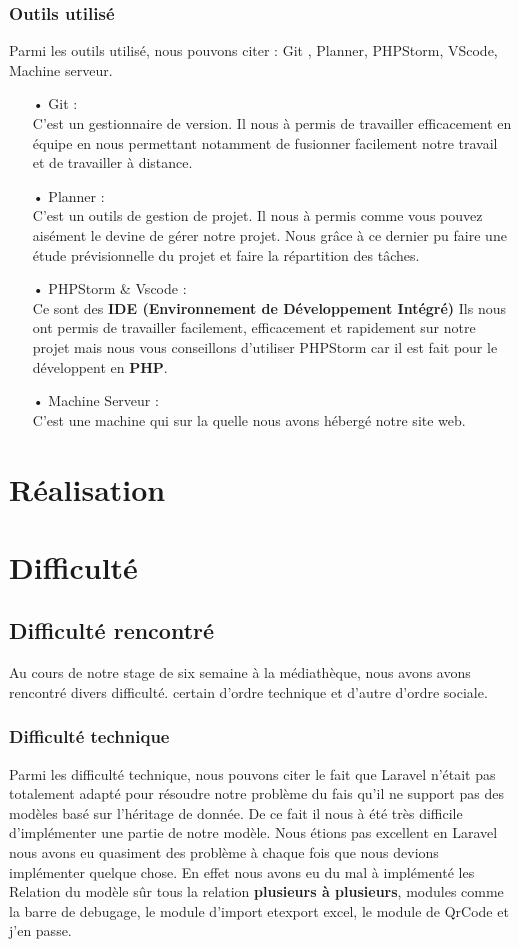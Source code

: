 \documentclass[12pt,a4paper]{article}
\begin{document}
\subsubsection{Outils utilisé}
Parmi les outils utilisé, nous pouvons citer : Git , Planner, PHPStorm, VScode, Machine serveur.
\begin{itemize}
\item[•] Git : \\
C'est un gestionnaire de version. Il nous à permis de travailler efficacement en équipe en nous
permettant notamment de fusionner facilement notre travail et de travailler à distance. 
\item[•] Planner : \\
C'est un outils de gestion de projet. Il nous à permis comme vous pouvez aisément le devine de 
gérer notre projet. Nous grâce à ce dernier pu faire une étude prévisionnelle du projet et faire
la répartition des tâches.
\item[•] PHPStorm \& Vscode : \\
Ce sont des \textbf{IDE (Environnement de Développement Intégré)} Ils nous ont permis de
travailler facilement, efficacement et rapidement sur notre projet mais nous vous conseillons 
d'utiliser PHPStorm car il est fait pour le développent en \textbf{PHP}.
\item[•] Machine Serveur : \\
C'est une machine qui sur la quelle nous avons hébergé notre site web.
\end{itemize}
\section{Réalisation}
\section{Difficulté}
\subsection{Difficulté rencontré}
Au cours de notre stage de six semaine à la médiathèque, nous avons avons rencontré divers 
difficulté. certain d'ordre technique et d'autre d'ordre sociale.
\subsubsection{Difficulté technique}
Parmi les difficulté technique, nous pouvons citer le fait que Laravel n'était pas totalement
adapté pour résoudre notre problème du fais qu'il ne support pas des modèles basé sur l'héritage
de donnée. De ce fait il nous à été très difficile d'implémenter une partie de notre modèle.
Nous étions pas excellent en Laravel nous avons eu quasiment des problème à chaque
fois que nous devions implémenter quelque chose. En effet nous avons eu du mal à implémenté les 
Relation du modèle sûr tous la relation \textbf{plusieurs à plusieurs}, modules comme la barre 
de debugage, le module d'import etexport excel, le module de QrCode et j'en passe. 
 
\end{document}

